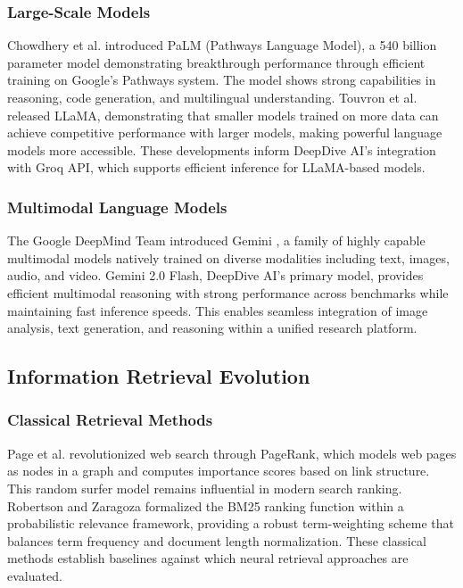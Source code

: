 \documentclass[conference]{IEEEtran}
\begin{document}
\subsubsection{Large-Scale Models}
Chowdhery et al. \cite{ref21} introduced PaLM (Pathways Language Model), a 540 billion parameter model demonstrating breakthrough performance through efficient training on Google's Pathways system. The model shows strong capabilities in reasoning, code generation, and multilingual understanding. Touvron et al. \cite{ref22} released LLaMA, demonstrating that smaller models trained on more data can achieve competitive performance with larger models, making powerful language models more accessible. These developments inform DeepDive AI's integration with Groq API, which supports efficient inference for LLaMA-based models.

\subsubsection{Multimodal Language Models}
The Google DeepMind Team introduced Gemini \cite{ref23}, a family of highly capable multimodal models natively trained on diverse modalities including text, images, audio, and video. Gemini 2.0 Flash, DeepDive AI's primary model, provides efficient multimodal reasoning with strong performance across benchmarks while maintaining fast inference speeds. This enables seamless integration of image analysis, text generation, and reasoning within a unified research platform.

\subsection{Information Retrieval Evolution}

\subsubsection{Classical Retrieval Methods}
Page et al. \cite{ref6} revolutionized web search through PageRank, which models web pages as nodes in a graph and computes importance scores based on link structure. This random surfer model remains influential in modern search ranking. Robertson and Zaragoza \cite{ref7} formalized the BM25 ranking function within a probabilistic relevance framework, providing a robust term-weighting scheme that balances term frequency and document length normalization. These classical methods establish baselines against which neural retrieval approaches are evaluated.
\end{document}
